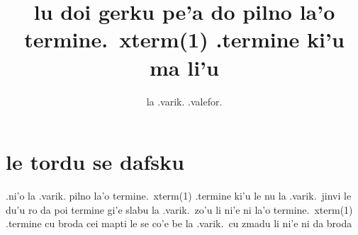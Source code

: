 \documentclass{article}
\title{lu doi gerku pe'a do pilno la'o termine.\ xterm(1) .termine ki'u ma li'u}
\author{la .varik. .valefor.}
\begin{document}
	\maketitle
	\section{le tordu se dafsku}
		.ni'o la .varik. pilno la'o termine.\ xterm(1) .termine ki'u le nu la .varik.\ jinvi le du'u ro da poi termine gi'e slabu la .varik.\ zo'u li ni'e ni la'o termine.\ xterm(1) .termine cu broda cei mapti le se co'e be la .varik.\ cu zmadu li ni'e ni da broda
\end{document}
